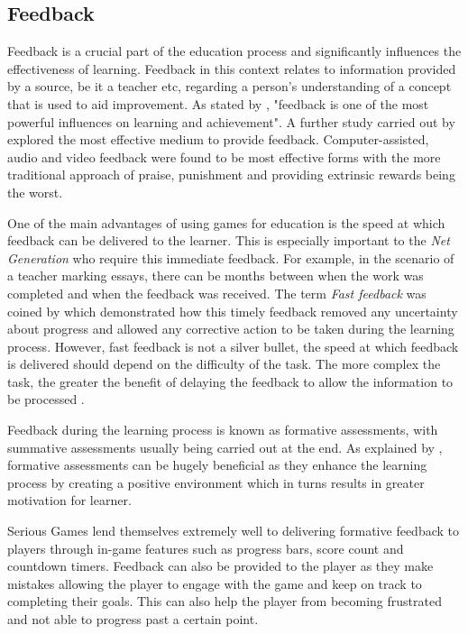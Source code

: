 \documentclass[12pt,a4paper]{report}
\begin{document}
\subsection{Feedback}
Feedback is a crucial part of the education process and significantly influences the effectiveness of learning. Feedback in this context relates to information provided by a source, be it a teacher etc, regarding a person's understanding of a concept that is used to aid improvement.
As stated by \cite{hattie2007power}, "feedback is
one of the most powerful influences on learning and achievement". A further study carried out by \cite{hattie2007power} explored the most effective medium to provide feedback. Computer-assisted, audio and video feedback were found to be most effective forms with the more traditional approach of praise, punishment and providing extrinsic rewards being the worst. 

One of the main advantages of using games for education is the speed at which feedback can be delivered to the learner. This is especially important to the \textit{Net Generation} who require this immediate feedback. For example, in the scenario of a teacher marking essays, there can be months between when the work was completed and when the feedback was received.  The term \textit{Fast feedback} was coined by \cite{lumsden1988characteristics} which demonstrated how this timely feedback removed any uncertainty about progress and allowed any corrective action to be taken during the learning process. However, fast feedback is not a silver bullet, the speed at which feedback is delivered should depend on the difficulty of the task. The more complex the task, the greater the benefit of delaying the feedback to allow the information to be processed \cite{clariana2000applying}.

Feedback during the learning process is known as formative assessments, with summative assessments usually being carried out at the end. As explained by \cite{irons2007enhancing}, formative assessments can be hugely beneficial as they enhance the learning process by creating a positive environment which in turns results in greater motivation for learner. 

Serious Games lend themselves extremely well to delivering formative feedback to players through in-game features such as progress bars, score count and countdown timers. Feedback can also be provided to the player as they make mistakes allowing the player to engage with the game and keep on track to completing their goals. This can also help the player from becoming frustrated and not able to progress past a certain point.
\end{document}
